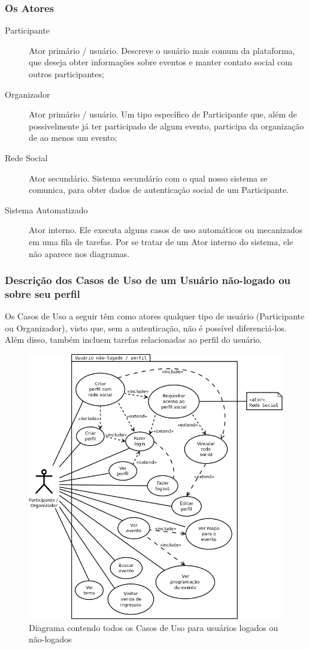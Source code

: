 \documentclass[12pt,a4paper,twoside,hyphens,english,brazil]{abntex2}
\begin{document}
{\subsubsection{Os Atores}
\begin{description}
	\item[Participante] Ator primário / usuário. Descreve o usuário mais comum da plataforma, que deseja obter informações sobre eventos e manter contato social com outros participantes;
	\item[Organizador] Ator primário / usuário. Um tipo específico de Participante que, além de possivelmente já ter participado de algum evento, participa da organização de ao menos um evento;
	\item[Rede Social] Ator secundário. Sistema secundário com o qual nosso sistema se comunica, para obter dados de autenticação social de um Participante.
	\item[Sistema Automatizado] Ator interno. Ele executa alguns casos de uso automáticos ou mecanizados em uma fila de tarefas. Por se tratar de um Ator interno do sistema, ele não aparece nos diagramas.
\end{description}

\subsubsection{Descrição dos Casos de Uso de um Usuário não-logado ou sobre seu perfil}
Os Casos de Uso a seguir têm como atores qualquer tipo de usuário (Participante ou Organizador), visto que, sem a autenticação, não é possível diferenciá-los. Além disso, também incluem tarefas relacionadas ao perfil do usuário.

\begin{figure}[!ht]
\centering
	\includegraphics[width=0.86\linewidth]{diagramas/uc-nao-logado.png}
	\caption{Diagrama contendo todos os Casos de Uso para usuários logados ou não-logados}
	\label{diag:uc-nao-logado}
\end{figure}

}
\end{document}
